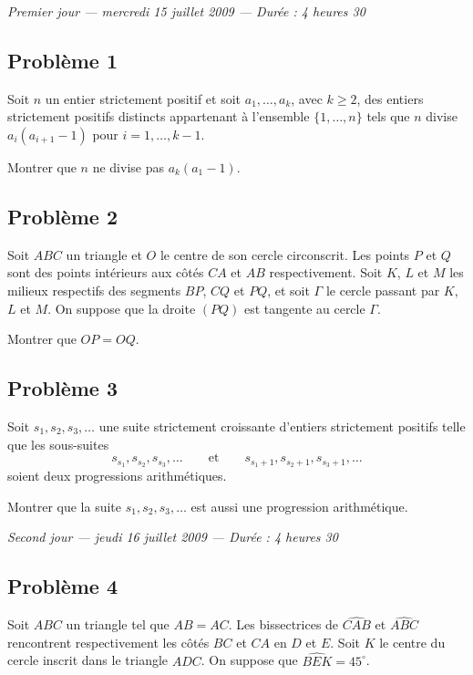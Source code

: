 
\begin{center}
  \emph{Premier jour --- mercredi 15 juillet 2009 --- Durée : 4 heures 30}
\end{center}

\subsection*{Problème 1}
Soit $n$ un entier strictement positif et soit $a_1, \ldots, a_k$, avec $k \geqslant 2$, des entiers
strictement positifs distincts appartenant à l'ensemble $\{1, \ldots, n\}$ tels que $n$ divise
$a_i(a_{i+1} - 1)$ pour $i = 1, \ldots, k - 1$.

Montrer que $n$ ne divise pas $a_k(a_1 - 1)$.

\subsection*{Problème 2}
Soit $ABC$ un triangle et $O$ le centre de son cercle circonscrit. Les points $P$ et $Q$ sont des points
intérieurs aux côtés $CA$ et $AB$ respectivement. Soit $K$, $L$ et $M$ les milieux respectifs des segments
$BP$, $CQ$ et $PQ$, et soit $\Gamma$ le cercle passant par $K$, $L$ et $M$. On suppose que la droite $(PQ)$
est tangente au cercle $\Gamma$.

Montrer que $OP = OQ$.

\subsection*{Problème 3}
Soit $s_1, s_2, s_3, \ldots$ une suite strictement croissante d'entiers strictement positifs telle que les
sous-suites
\[
s_{s_1}, s_{s_2}, s_{s_3}, \ldots \qquad \text{et} \qquad s_{s_1+1}, s_{s_2+1}, s_{s_3+1}, \ldots
\]
soient deux progressions arithmétiques.

Montrer que la suite $s_1, s_2, s_3, \ldots$ est aussi une progression arithmétique.

\bigskip
\begin{center}
  \emph{Second jour --- jeudi 16 juillet 2009 --- Durée : 4 heures 30}
\end{center}

\subsection*{Problème 4}
Soit $ABC$ un triangle tel que $AB = AC$. Les bissectrices de $\widehat{CAB}$ et $\widehat{ABC}$ rencontrent
respectivement les côtés $BC$ et $CA$ en $D$ et $E$. Soit $K$ le centre du cercle inscrit dans le triangle
$ADC$. On suppose que $\widehat{BEK} = 45^\circ$.


